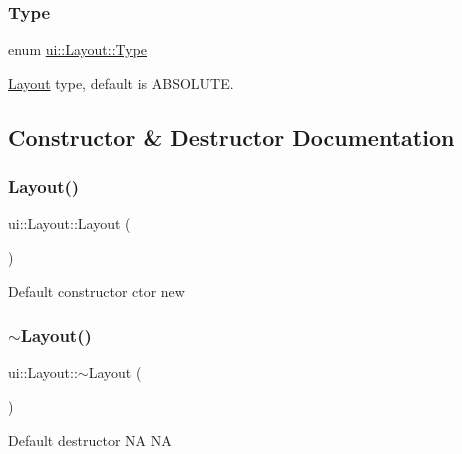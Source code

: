 \subsubsection{\texorpdfstring{Type}{Type}\hspace{0.1cm}{\footnotesize\ttfamily [2/2]}}
{\footnotesize\ttfamily enum \hyperlink{classui_1_1Layout_aecabbc1592677eadd6757edc1df5b952}{ui\+::\+Layout\+::\+Type}\hspace{0.3cm}{\ttfamily [strong]}}

\hyperlink{classui_1_1Layout}{Layout} type, default is A\+B\+S\+O\+L\+U\+TE. 

\subsection{Constructor \& Destructor Documentation}
\mbox{\label{classui_1_1Layout_a66721b8d2153b0d8752a03f02787eab2}} 
\subsubsection{\texorpdfstring{Layout()}{Layout()}\hspace{0.1cm}{\footnotesize\ttfamily [1/2]}}
{\footnotesize\ttfamily ui\+::\+Layout\+::\+Layout (\begin{DoxyParamCaption}{ }\end{DoxyParamCaption})}

Default constructor  ctor  new \mbox{\label{classui_1_1Layout_a5a3bb9fd59ef8d13f9e9aad4c6356f0c}} 
\subsubsection{\texorpdfstring{$\sim$\+Layout()}{~Layout()}\hspace{0.1cm}{\footnotesize\ttfamily [1/2]}}
{\footnotesize\ttfamily ui\+::\+Layout\+::$\sim$\+Layout (\begin{DoxyParamCaption}{ }\end{DoxyParamCaption})\hspace{0.3cm}{\ttfamily [virtual]}}

Default destructor  NA  NA \mbox{\label{classui_1_1Layout_a66721b8d2153b0d8752a03f02787eab2}} 
